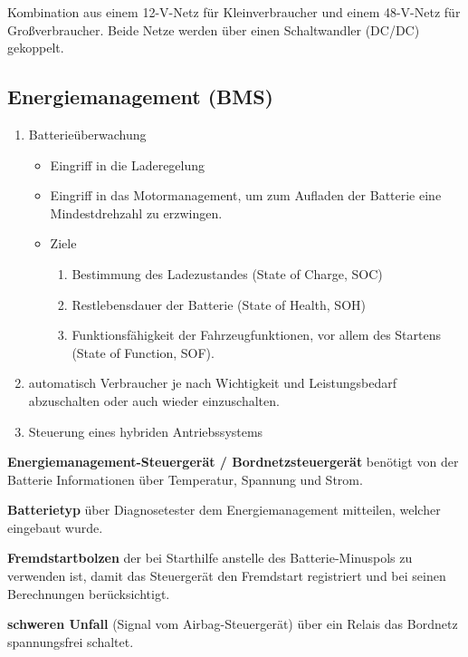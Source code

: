 Kombination aus einem 12-V-Netz für Kleinverbraucher und einem 48-V-Netz
für Großverbraucher. Beide Netze werden über einen Schaltwandler (DC/DC)
gekoppelt.

\newpage

\subsection{Energiemanagement (BMS)}\label{energiemanagement-bms}

\begin{enumerate}
\item
  Batterieüberwachung

  \begin{itemize}
  \item
    Eingriff in die Laderegelung
  \item
    Eingriff in das Motormanagement, um zum Aufladen der Batterie eine
    Mindestdrehzahl zu erzwingen.
  \item
    Ziele

    \begin{enumerate}
    \def\labelenumii{\arabic{enumii}.}
    \item
      Bestimmung des Ladezustandes (State of Charge, SOC)
    \item
      Restlebensdauer der Batterie (State of Health, SOH)
    \item
      Funktionsfähigkeit der Fahrzeugfunktionen, vor allem des Startens
      (State of Function, SOF).
    \end{enumerate}
  \end{itemize}
\item
  automatisch Verbraucher je nach Wichtigkeit und Leistungsbedarf
  abzuschalten oder auch wieder einzuschalten.
\item
  Steuerung eines hybriden Antriebssystems
\end{enumerate}

\textbf{Energiemanagement-Steuergerät / Bordnetzsteuergerät} benötigt
von der Batterie Informationen über Temperatur, Spannung und Strom.

\textbf{Batterietyp} über Diagnosetester dem Energiemanagement
mitteilen, welcher eingebaut wurde.

\textbf{Fremdstartbolzen} der bei Starthilfe anstelle des
Batterie-Minuspols zu verwenden ist, damit das Steuergerät den
Fremdstart registriert und bei seinen Berechnungen berücksichtigt.

\textbf{schweren Unfall} (Signal vom Airbag-Steuergerät) über ein Relais
das Bordnetz spannungsfrei schaltet.

